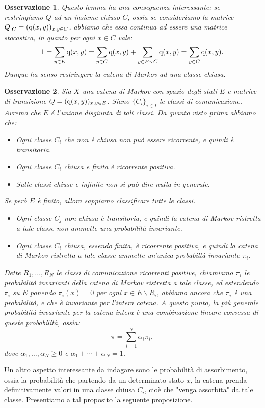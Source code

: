 \documentclass[11pt]{book}
\theoremstyle{Definizione}
\theoremstyle{TeoremaProposizioneLemmaCorollario}
\theoremstyle{OsservazioneNota}
\newtheorem{myobs}{Osservazione}[section]
\newcommand{\sub}[2]{{#1}_{|{#2}}}
\newcommand{\tolto}{\smallsetminus}
\newcommand{\q}{\textup{q}}
\begin{document}
\begin{myobs}
Questo lemma ha una conseguenza interessante: se restringiamo $Q$ ad un insieme chiuso $C$, ossia se consideriamo la matrice $\sub{Q}{C} = (\q(x,y))_{x,y\in C}$, abbiamo che essa continua ad essere una matrice stocastica, in quanto per ogni $x\in C$ vale:
$$
1 = \sum_{y\in E} \q(x,y) = \sum_{y\in C} \q(x,y) + \sum_{y\in E\tolto C}\q(x,y) = \sum_{y\in C} \q(x,y).
$$
Dunque ha senso restringere la catena di Markov ad una classe chiusa.
\end{myobs}
\begin{myobs}
Sia $X$ una catena di Markov con spazio degli stati $E$ e matrice di transizione $Q = (\q(x,y))_{x,y\in E}$. Siano $\{C_i\}_{i\in I}$ le classi di comunicazione. Avremo che $E$ é l'unione disgiunta di tali classi. Da quanto visto prima abbiamo che:
\begin{itemize}
\item Ogni classe $C_i$ che non è chiusa non può essere ricorrente, e quindi è transitoria.
\item Ogni classe $C_i$ chiusa e finita è ricorrente positiva.
\item Sulle classi chiuse e infinite non si può dire nulla in generale.
\end{itemize}
Se però $E$ è finito, allora sappiamo classificare tutte le classi.
\begin{itemize}
\item Ogni classe $C_j$ non chiusa è transitoria, e quindi la catena di Markov ristretta a tale classe non ammette una probabilità invariante.
\item Ogni classe $C_i$ chiusa, essendo finita, è ricorrente positiva, e quindi la catena di Markov ristretta a tale classe ammette un'unica probabiltà invariante $\pi_i$.
\end{itemize}
Dette $R_1,\dots,R_N$ le classi di comunicazione ricorrenti positive, chiamiamo $\pi_i$ le probabilità invarianti della catena di Markov ristretta a tale classe, ed estendendo $\pi_i$ su $E$ ponendo $\pi_i(x) = 0$ per ogni $x\in E\tolto R_i$, abbiamo ancora che $\pi_i$ è una probabilità, e che è invariante per l'intera catena. A questo punto, la più generale probabilità invariante per la catena intera è una combinazione lineare convessa di queste probabilità, ossia:
$$
\pi = \sum_{i = 1}^N \alpha_i \pi_i,
$$
dove $\alpha_1,\dots,\alpha_N\geq 0$ e $\alpha_1+\cdots+\alpha_N = 1$.
\end{myobs}
Un altro aspetto interessante da indagare sono le probabilità di assorbimento, ossia la probabilità che partendo da un determinato stato $x$, la catena prenda definitivamente valori in una classe chiusa $C_i$, cioè che "venga assorbita" da tale classe. Presentiamo a tal proposito la seguente proposizione.
\end{document}
